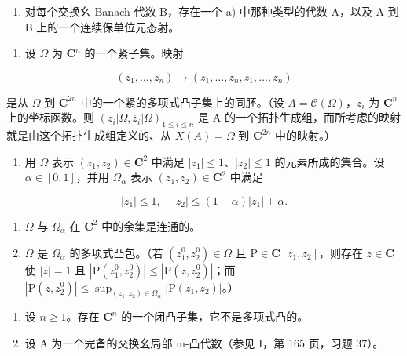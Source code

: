 \begin{enumerate}
\def\labelenumi{\alph{enumi})}
\setcounter{enumi}{1}
\tightlist
\item
  对每个交换幺 Banach 代数 B，存在一个 a) 中那种类型的代数 A，以及 A 到 B 上的一个连续保单位元态射。
\end{enumerate}

\begin{enumerate}
\def\labelenumi{\arabic{enumi})}
\setcounter{enumi}{21}
\tightlist
\item
  设 \(\Omega\) 为 \(\mathbf{C}^n\) 的一个紧子集。映射
\end{enumerate}

\[
(z _ {1}, \ldots , z _ {n}) \longmapsto (z _ {1}, \ldots , z _ {n}, \overline {{z}} _ {1}, \ldots , \overline {{z}} _ {n})
\]

是从 \(\Omega\) 到 \(\mathbf{C}^{2n}\) 中的一个紧的多项式凸子集上的同胚。（设 \(A = \mathcal{C}(\Omega)\)，\(z_i\) 为 \(\mathbf{C}^n\) 上的坐标函数。则 \((z_i|\Omega, \overline{z}_i|\Omega)_{1 \leqslant i \leqslant n}\) 是 A 的一个拓扑生成组，而所考虑的映射就是由这个拓扑生成组定义的、从 \(X(A) = \Omega\) 到 \(\mathbf{C}^{2n}\) 中的映射。）

\begin{enumerate}
\def\labelenumi{\arabic{enumi})}
\setcounter{enumi}{22}
\tightlist
\item
  用 \(\Omega\) 表示 \((z_1, z_2) \in \mathbf{C}^2\) 中满足 \(|z_1| \leqslant 1\)、\(|z_2| \leqslant 1\) 的元素所成的集合。设 \(\alpha \in [0,1]\)，并用 \(\Omega_\alpha\) 表示 \((z_1, z_2) \in \mathbf{C}^2\) 中满足
\end{enumerate}

\[
| z _ {1} | \leqslant 1, \quad | z _ {2} | \leqslant (1 - \alpha) | z _ {1} | + \alpha .
\]

\begin{enumerate}
\def\labelenumi{\alph{enumi})}
\item
  \(\Omega\) 与 \(\Omega_{\alpha}\) 在 \(\mathbf{C}^2\) 中的余集是连通的。
\item
  \(\Omega\) 是 \(\Omega_{\alpha}\) 的多项式凸包。（若 \((z_1^0, z_2^0) \in \Omega\) 且 \(\mathrm{P} \in \mathbf{C}[z_1, z_2]\)，则存在 \(z \in \mathbf{C}\) 使 \(|z| = 1\) 且 \(|\mathrm{P}(z_1^0, z_2^0)| \leqslant |\mathrm{P}(z, z_2^0)|\)；而 \(|\mathrm{P}(z, z_2^0)| \leqslant \sup_{(z_1, z_2) \in \Omega_{\alpha}} |\mathrm{P}(z_1, z_2)|\)。）
\end{enumerate}

\begin{enumerate}
\def\labelenumi{\arabic{enumi})}
\setcounter{enumi}{23}
\item
  设 \(n \geqslant 1\)。存在 \(\mathbf{C}^{n}\) 的一个闭凸子集，它不是多项式凸的。
\item
  设 A 为一个完备的交换幺局部 m-凸代数（参见 I，第 165 页，习题 37）。
\end{enumerate}

